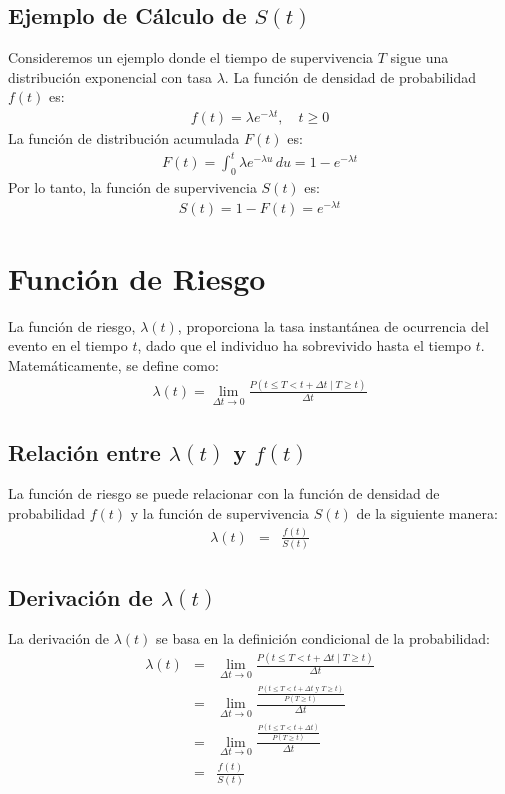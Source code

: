 \subsection{Ejemplo de Cálculo de $S(t)$}
Consideremos un ejemplo donde el tiempo de supervivencia $T$ sigue una distribuci\'on exponencial con tasa $\lambda$. La funci\'on de densidad de probabilidad $f(t)$ es:
\begin{eqnarray*}
f(t) = \lambda e^{-\lambda t}, \quad t \geq 0
\end{eqnarray*}
La funci\'on de distribuci\'on acumulada $F(t)$ es:
\begin{eqnarray*}
F(t) = \int_0^t \lambda e^{-\lambda u} \, du = 1 - e^{-\lambda t}
\end{eqnarray*}
Por lo tanto, la funci\'on de supervivencia $S(t)$ es:
\begin{eqnarray*}
S(t) = 1 - F(t) = e^{-\lambda t}
\end{eqnarray*}

\section{Funci\'on de Riesgo}
La funci\'on de riesgo, $\lambda(t)$, proporciona la tasa instant\'anea de ocurrencia del evento en el tiempo $t$, dado que el individuo ha sobrevivido hasta el tiempo $t$. Matem\'aticamente, se define como:
\begin{eqnarray*}
\lambda(t) = \lim_{\Delta t \to 0} \frac{P(t \leq T < t + \Delta t \mid T \geq t)}{\Delta t}
\end{eqnarray*}

\subsection{Relaci\'on entre $\lambda(t)$ y $f(t)$}
La funci\'on de riesgo se puede relacionar con la funci\'on de densidad de probabilidad $f(t)$ y la funci\'on de supervivencia $S(t)$ de la siguiente manera:
\begin{eqnarray*}
\lambda(t) &=& \frac{f(t)}{S(t)}
\end{eqnarray*}

\subsection{Derivaci\'on de $\lambda(t)$}
La derivaci\'on de $\lambda(t)$ se basa en la definici\'on condicional de la probabilidad:
\begin{eqnarray*}
\lambda(t) &=& \lim_{\Delta t \to 0} \frac{P(t \leq T < t + \Delta t \mid T \geq t)}{\Delta t} \\
           &=& \lim_{\Delta t \to 0} \frac{\frac{P(t \leq T < t + \Delta t \text{ y } T \geq t)}{P(T \geq t)}}{\Delta t} \\
           &=& \lim_{\Delta t \to 0} \frac{\frac{P(t \leq T < t + \Delta t)}{P(T \geq t)}}{\Delta t} \\
           &=& \frac{f(t)}{S(t)}
\end{eqnarray*}

